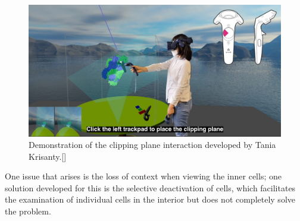 \begin{figure}
	\vspace{-0.7cm}
	\includegraphics[width=1\linewidth]{fig/Images/Krisanty_clipping}
	\caption[]{Demonstration of the clipping plane interaction developed by Tania Krisanty.[\cite{krisanty_2022}]}
	\label{fig:tania}
\end{figure}
One issue that arises is the loss of context when viewing the inner cells; one solution developed for this is the selective deactivation of cells, which facilitates the examination of individual cells in the interior but does not completely solve the problem.

